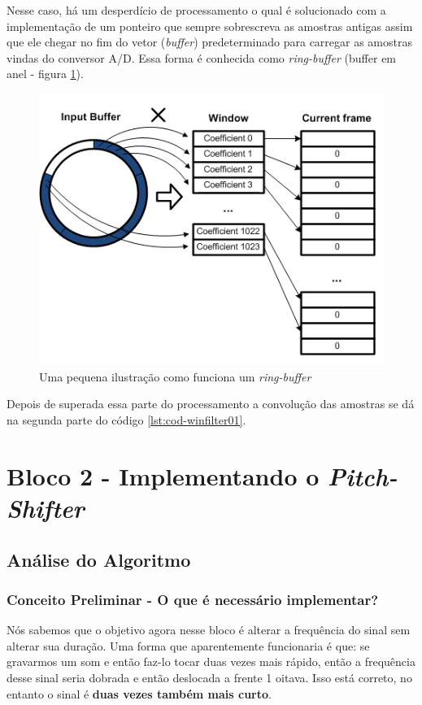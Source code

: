 		Nesse caso, há um desperdício de processamento o qual é solucionado com a implementação de um ponteiro que sempre sobrescreva as amostras antigas assim que ele chegar no fim do vetor (\textit{buffer}) predeterminado para carregar as amostras vindas do conversor A/D. Essa forma é conhecida como \textit{ring-buffer} (buffer em anel - figura \ref{fig-ringbuffer}).
		
		\begin{figure}[!ht]
			\centering
			\includegraphics[scale=0.5]{./figuras/ringbuffer.png}
			\caption{Uma pequena ilustração como funciona um \textit{ring-buffer}}
			\label{fig-ringbuffer}
		\end{figure}
		
		Depois de superada essa parte do processamento a convolução das amostras se dá na segunda parte do código \ref{lst:cod-winfilter01}.
		
				
\section{Bloco 2 - Implementando o \textit{Pitch-Shifter}}

	\subsection{Análise do Algoritmo}
		\subsubsection{Conceito Preliminar - O que é necessário implementar?}
			
			Nós sabemos que o objetivo agora nesse bloco é alterar a frequência do sinal sem alterar sua duração. Uma forma que aparentemente funcionaria é que: se gravarmos um som e então faz-lo tocar duas vezes mais rápido, então a frequência desse sinal seria dobrada e então deslocada a frente 1 oitava. Isso está correto, no entanto o sinal é \textbf{duas vezes também mais curto}.
			
